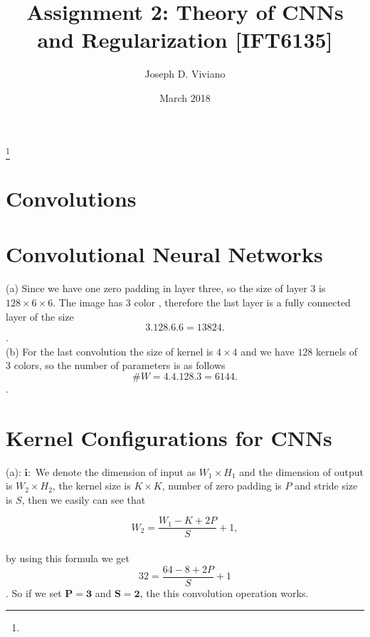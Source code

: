 \documentclass{amsart}
\theoremstyle{definition}
\theoremstyle{remark}
\numberwithin{equation}{section}
\begin{document}
\title{Assignment 2: Theory of CNNs and Regularization [IFT6135]}

\author{Joseph D. Viviano}
\address{Universit\'e de Montr\'eal}
\curraddr{}
\thanks{}
\date{March 2018}

\maketitle





\section{Convolutions}


\section{Convolutional Neural Networks}

(a) Since we have one zero padding in layer three, so the size of layer $3$ is  $128 \times6 \times6$. The image has $3$ color , therefore the last layer is a fully connected layer of the size $$3.128.6.6= 13824.$$. \\

(b) For the last convolution the size of kernel is $4\times4$ and we have $128$ kernels of $3$ colors, so the number of parameters is as follows $$\#W= 4.4.128.3=6144.$$. \\


\section{Kernel Configurations for CNNs}

(a): $\bm{i}:$ We denote the dimension of input as $W_1\times H_1$ and the dimension of output is $W_2\times H_2$, the kernel size is $K\times K$, number of zero padding is $P$ and stride size is $S$, then we easily can see that

\begin{equation}\label{conv1}
W_2= \frac{W_1-K+2P}{S}+1,
\end{equation} \\

by using this formula we get $$32=\frac{64-8+2P}{S}+1$$. So if we set $\bm{P=3}$
and $\bm{S=2}$, the this convolution operation works.\\
\end{document}
